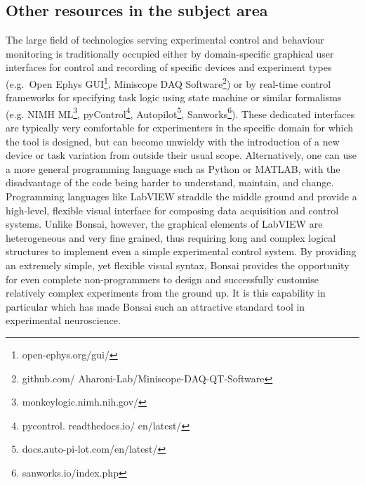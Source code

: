 \subsection*{Other resources in the subject area}

The large field of technologies serving experimental control and behaviour monitoring is traditionally occupied either by domain-specific graphical
user interfaces for control and recording of specific devices and experiment
types (e.g.\ Open Ephys
GUI\footnote{open-ephys.org/gui/},
Miniscope DAQ
Software\footnote{github.com/ Aharoni-Lab/Miniscope-DAQ-QT-Software})
or by real-time control frameworks for specifying task logic using state
machine or similar formalisms (e.g. NIMH ML\footnote{monkeylogic.nimh.nih.gov/},
pyControl\footnote{pycontrol. readthedocs.io/ en/latest/},
Autopilot\footnote{docs.auto-pi-lot.com/en/latest/},
Sanworks\footnote{sanworks.io/index.php}).\break
These dedicated interfaces are typically very comfortable for experimenters in the specific domain for which the tool is designed, but can become unwieldy with the introduction of a new device or task variation from outside their usual scope. Alternatively, one can use a more general programming language such as Python or MATLAB, with the disadvantage
of the code being harder to understand, maintain, and change. Programming
languages like LabVIEW straddle the middle ground and provide a high-level, flexible visual interface for composing data acquisition and control systems. Unlike Bonsai, however, the graphical elements of LabVIEW are
heterogeneous and very fine grained, thus requiring long and complex
logical structures to implement even a simple experimental control system. By providing an extremely simple, yet flexible visual syntax, Bonsai provides the
opportunity for even complete non-programmers to design and successfully
customise relatively complex experiments from the ground up. It is this
capability in particular which has made Bonsai such an attractive standard tool in
experimental neuroscience.

